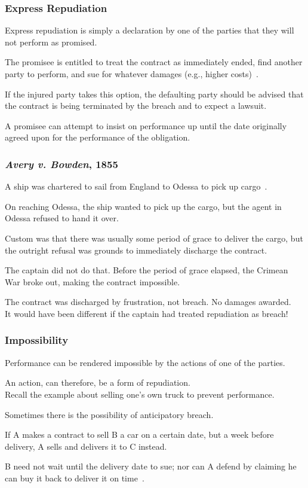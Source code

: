 \begin{frame}
\frametitle{Express Repudiation}

Express repudiation is simply a declaration by one of the parties that they will not perform as promised.

The promisee is entitled to treat the contract as immediately ended, find another party to perform, and sue for whatever damages (e.g., higher costs)~\cite{lba}.

If the injured party takes this option, the defaulting party should be advised that the contract is being terminated by the breach and to expect a lawsuit.

A promisee can attempt to insist on performance up until the date originally agreed upon for the performance of the obligation. 

\end{frame}



\begin{frame}
\frametitle{\textit{Avery v. Bowden}, 1855}

A ship was chartered to sail from England to Odessa to pick up cargo~\cite{lba}.

On reaching Odessa, the ship wanted to pick up the cargo, but the agent in Odessa refused to hand it over.

Custom was that there was usually some period of grace to deliver the cargo, but the outright refusal was grounds to immediately discharge the contract.

The captain did not do that. Before the period of grace elapsed, the Crimean War broke out, making the contract impossible.

The contract was discharged by frustration, not breach. No damages awarded.\\
\quad It would have been different if the captain had treated repudiation as breach!

\end{frame}



\begin{frame}
\frametitle{Impossibility}

Performance can be rendered impossible by the actions of one of the parties.

An action, can therefore, be a form of repudiation.\\
\quad Recall the example about selling one's own truck to prevent performance.

Sometimes there is the possibility of \alert{anticipatory breach}.

If A makes a contract to sell B a car on a certain date, but a week before delivery, A sells and delivers it to C instead.

B need not wait until the delivery date to sue; nor can A defend by claiming he can buy it back to deliver it on time~\cite{lba}.

\end{frame}

